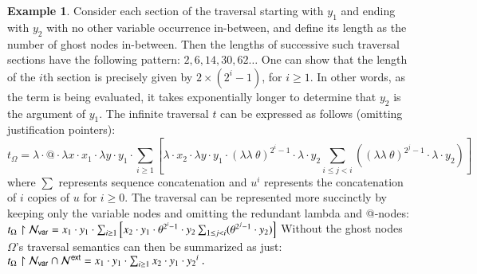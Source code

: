 \documentclass{elsarticle}
\theoremstyle{plain}
\theoremstyle{definition}
\newtheorem{example}{Example}[section]
\theoremstyle{remark}
\newcommand\Nodes{\mathcal{N}}%
\newcommand\NodesVar{\Nodes_{\sf var}}%
\newcommand{\ghostlmd}{{\lambda\!\!\lambda}}
\newcommand{\ghostvar}{\theta}
\newcommand{\ExtNodes}{\Nodes^{\sf ext}}
\begin{document}
\begin{example}
    Consider each section of the traversal starting with $y_1$ and ending with $y_2$ with no other variable occurrence in-between, and define its length as the number of ghost nodes in-between. Then the lengths of successive such traversal sections have the following pattern: $2,6,14,30,62\ldots$
    One can show that the length of the $i$th section is precisely given by $2\times(2^i-1)$, for $i\geq1$.
    In other words, as the term is being evaluated, it takes exponentially longer to determine that $y_2$ is the argument of $y_1$.
    The infinite traversal $t$ can be expressed as follows (omitting justification pointers):
    \begin{equation*}
    t_\Omega = \lambda \cdot @ \cdot \lambda x \cdot  x_1 \cdot \lambda y \cdot y_1
    \cdot  \sum_{i\geq 1}
        \left[
            \lambda \cdot x_2 \cdot \lambda y \cdot y_1 \cdot
             {(\ghostlmd\ \ghostvar)}^{2^i -1}\cdot \lambda \cdot y_2
                 \sum_{i\leq j<i}
                    \left(
                        {(\ghostlmd\ \ghostvar)}^{2^j -1}
                        \cdot
                        \lambda \cdot y_2
                    \right)
        \right]
    \end{equation*}
    where $\sum$ represents sequence concatenation and $u^i$ represents the concatenation of $i$ copies of $u$ for $i\geq 0$.
    The traversal can be represented more succinctly by keeping only the variable nodes and omitting the redundant lambda and @-nodes:
    $t_\Omega \filter \NodesVar =  x_1 \cdot y_1
        \cdot  \sum_{i\geq 1}
            \left[
                x_2 \cdot y_1 \cdot
                 \ghostvar^{2^i -1}\cdot y_2
                     \sum_{1\leq j <i} (\ghostvar^{2^j -1} \cdot y_2)
            \right]
    $
    Without the ghost nodes $\Omega$'s traversal semantics can then be summarized as just:
    $
        t_\Omega \filter \NodesVar\inter\ExtNodes =  x_1 \cdot y_1
        \cdot  \sum_{i\geq 1} x_2 \cdot y_1 \cdot {y_2}^i \ .
    $
\end{example}
\end{document}
